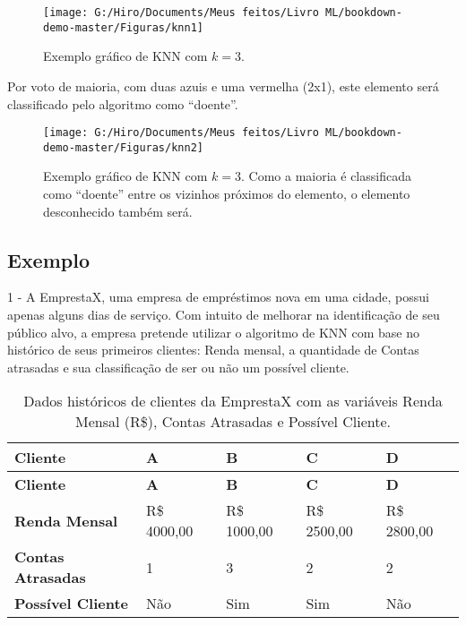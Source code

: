 \documentclass[
]{book}
\begin{document}
\begin{figure}

{\centering \texttt{[image: G:/Hiro/Documents/Meus feitos/Livro ML/bookdown-demo-master/Figuras/knn1]} 

}

\caption{Exemplo gráfico de KNN com \(k=3\).}\label{fig:knn1}
\end{figure}



Por voto de maioria, com duas azuis e uma vermelha (2x1), este elemento será classificado pelo algoritmo como ``doente''.

\begin{figure}

{\centering \texttt{[image: G:/Hiro/Documents/Meus feitos/Livro ML/bookdown-demo-master/Figuras/knn2]} 

}

\caption{Exemplo gráfico de KNN com \(k=3\). Como a maioria é classificada como ``doente'' entre os vizinhos próximos do elemento, o elemento desconhecido também será.}\label{fig:knn2}
\end{figure}



\hypertarget{exknn}{%
\subsection{Exemplo}\label{exknn}}

1 - A EmprestaX, uma empresa de empréstimos nova em uma cidade, possui apenas alguns dias de serviço. Com intuito de melhorar na identificação de seu público alvo, a empresa pretende utilizar o algoritmo de KNN com base no histórico de seus primeiros clientes: Renda mensal, a quantidade de Contas atrasadas e sua classificação de ser ou não um possível cliente.

\begin{longtable}[]{@{}lllll@{}}
\caption{\label{tab:dadossrendaaknn} Dados históricos de clientes da EmprestaX com as variáveis Renda Mensal (R\$), Contas Atrasadas e Possível Cliente.}\tabularnewline
\toprule
\textbf{Cliente} & \textbf{A} & \textbf{B} & \textbf{C} & \textbf{D}\tabularnewline
\midrule
\endfirsthead
\toprule
\textbf{Cliente} & \textbf{A} & \textbf{B} & \textbf{C} & \textbf{D}\tabularnewline
\midrule
\endhead
\textbf{Renda Mensal} & R\$ 4000,00 & R\$ 1000,00 & R\$ 2500,00 & R\$ 2800,00\tabularnewline
\textbf{Contas Atrasadas} & 1 & 3 & 2 & 2\tabularnewline
\textbf{Possível Cliente} & Não & Sim & Sim & Não\tabularnewline
\bottomrule
\end{longtable}
\end{document}

